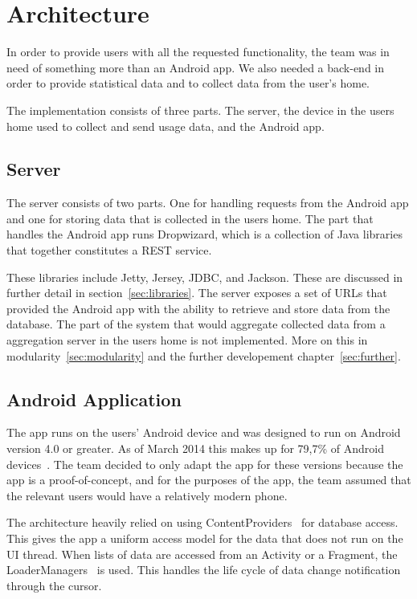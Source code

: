 \section{Architecture}
In order to provide users with all the requested functionality, the team was in need of something more than an Android app. We also needed a back-end in order to provide statistical data and to collect data from the user's home.

The implementation consists of three parts. The server, the device in the users home used to collect and send usage data, and the Android app.

\subsection{Server}
The server consists of two parts. One for handling requests from the Android app and one for storing data that is collected in the users home. 
The part that handles the Android app runs Dropwizard, which is a collection of Java libraries that together constitutes a REST service. 

These libraries include Jetty, Jersey, JDBC, and Jackson. These are discussed in further detail in section~\ref{sec:libraries}. The server exposes a set of URLs that provided the Android app with the ability to retrieve and store data from the database. The part of the system that would aggregate collected data from a aggregation server in the users home is not implemented. More on this in modularity~\ref{sec:modularity} and the further developement chapter~\ref{sec:further}.

\subsection{Android Application}
The app runs on the users' Android device and was designed to run on Android version 4.0 or greater. As of March 2014 this makes up for 79,7\% of Android devices~\cite{AndroidDeviceFragmentation}. The team decided to only adapt the app for these versions because the app is a proof-of-concept, and for the purposes of the app, the team assumed that the relevant users would have a relatively modern phone. 

The architecture heavily relied on using ContentProviders~\cite{contentproviders} for database access. This gives the app a uniform access model for the data that does not run on the UI thread. When lists of data are accessed from an Activity or a Fragment, the LoaderManagers~\cite{loadermanager} is used. This handles the life cycle of data change notification through the cursor. 

